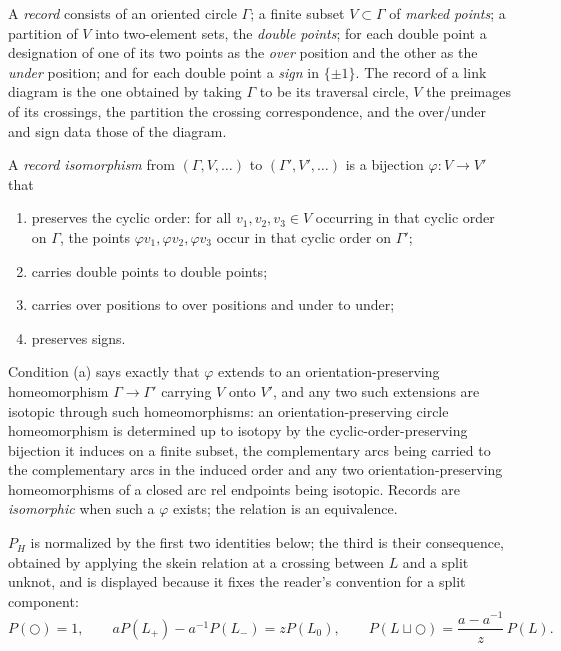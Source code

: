 \begin{definition}\label{def:record}
A \emph{record} consists of an oriented circle $\Gamma$; a finite subset
$V\subset\Gamma$ of \emph{marked points}; a partition of $V$ into two-element
sets, the \emph{double points}; for each double point a designation of one of
its two points as the \emph{over} position and the other as the \emph{under}
position; and for each double point a \emph{sign} in $\{\pm1\}$. The record of a
link diagram is the one obtained by taking $\Gamma$ to be its traversal circle,
$V$ the preimages of its crossings, the partition the crossing correspondence,
and the over/under and sign data those of the diagram.

A \emph{record isomorphism} from $(\Gamma,V,\dots)$ to $(\Gamma',V',\dots)$ is a
bijection $\varphi:V\to V'$ that
\begin{enumerate}
\item[(a)] preserves the cyclic order: for all $v_1,v_2,v_3\in V$ occurring in
that cyclic order on $\Gamma$, the points $\varphi v_1,\varphi v_2,\varphi v_3$
occur in that cyclic order on $\Gamma'$;
\item[(b)] carries double points to double points;
\item[(c)] carries over positions to over positions and under to under;
\item[(d)] preserves signs.
\end{enumerate}
Condition (a) says exactly that $\varphi$ extends to an orientation-preserving
homeomorphism $\Gamma\to\Gamma'$ carrying $V$ onto $V'$, and any two such
extensions are isotopic through such homeomorphisms: an orientation-preserving
circle homeomorphism is determined up to isotopy by the cyclic-order-preserving
bijection it induces on a finite subset, the complementary arcs being carried to
the complementary arcs in the induced order and any two orientation-preserving
homeomorphisms of a closed arc rel endpoints being isotopic. Records are
\emph{isomorphic} when such a $\varphi$ exists; the relation is an equivalence.
\end{definition}

\begin{definition}\label{def:homfly}
$P_H$ is normalized by the first two identities below; the third is their
consequence, obtained by applying the skein relation at a crossing between $L$
and a split unknot, and is displayed because it fixes the reader's convention
for a split component:
\begin{equation}
P(\bigcirc)=1,\qquad
aP(L_+)-a^{-1}P(L_-)=zP(L_0),\qquad
P(L\sqcup\bigcirc)=\frac{a-a^{-1}}{z}\,P(L).
\label{eq:homfly}
\end{equation}
\end{definition}

